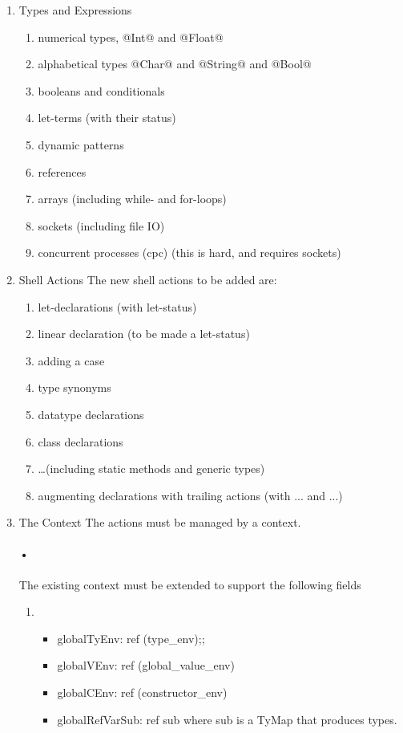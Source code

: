 \documentclass[12pt]{article}
\begin{document}
\begin{enumerate}

\item{Types and Expressions}

\begin{enumerate}[label*=\arabic*]
\item numerical types, @Int@ and @Float@
\item alphabetical types @Char@ and @String@ and @Bool@
\item booleans and conditionals 
\item let-terms (with their status) 
\item dynamic patterns 
\item references 
\item arrays (including while- and for-loops) 
\item sockets (including file IO)
\item concurrent processes (cpc) (this is hard, and requires sockets)  
\end{enumerate}


\item{Shell Actions}
The new shell actions to be added are:
\begin{enumerate}[label*=\arabic*]
\item let-declarations (with let-status) 
\item linear declaration (to be made a let-status) 
\item adding a case
\item type synonyms 
\item datatype declarations
\item class declarations 
\item \ldots (including static methods and generic types)
\item augmenting declarations with trailing actions (with ... and ...)  
\end{enumerate}

\item{The Context}
The actions must be managed by a context.
\paragraph*{•}
The existing context must be
extended to support the following fields
\begin{enumerate}[label*=\arabic*]
\item
\begin{itemize}
\item globalTyEnv: ref (type_env);;
\item globalVEnv: ref (global_value_env) 
\item globalCEnv: ref (constructor_env) 
\item globalRefVarSub: ref sub where sub is a TyMap that produces types. 
\end{itemize}
\end{enumerate}


\end{enumerate}
\end{document}
